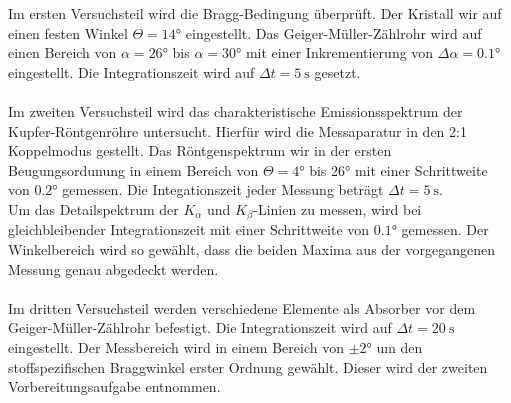 Im ersten Versuchsteil wird die Bragg-Bedingung überprüft. Der Kristall wir auf einen festen Winkel $Θ = 14°$ eingestellt.
Das Geiger-Müller-Zählrohr wird auf einen Bereich von $α = 26°$ bis $α = 30°$ mit einer Inkrementierung von $Δα = 0.1°$ eingestellt. Die Integrationszeit wird auf $Δt = \SI{5}{\second}$ gesetzt.\\
\\
Im zweiten Versuchsteil wird das charakteristische Emissionsspektrum der Kupfer-Röntgenröhre untersucht. Hierfür wird die Messaparatur in den 2:1 Koppelmodus
gestellt. Das Röntgenspektrum wir in der ersten Beugungsordunung in einem Bereich von $Θ = 4°$ bis $26°$ mit einer Schrittweite von $0.2°$ gemessen. Die Integationszeit jeder Messung beträgt $Δt = \SI{5}{\second}$.\\
Um das Detailspektrum der $K_α$ und $K_β$-Linien zu messen, wird bei gleichbleibender Integrationszeit mit einer Schrittweite von $0.1°$ gemessen. Der Winkelbereich wird so gewählt, dass die beiden Maxima aus der vorgegangenen Messung
genau abgedeckt werden.\\
\\
Im dritten Versuchsteil werden verschiedene Elemente als Absorber vor dem Geiger-Müller-Zählrohr befestigt. Die Integrationszeit wird auf $Δt = \SI{20}{\second}$ eingestellt.
Der Messbereich wird in einem Bereich von $\pm2°$ um den stoffspezifischen Braggwinkel erster Ordnung gewählt. Dieser wird der zweiten Vorbereitungsaufgabe entnommen.\\